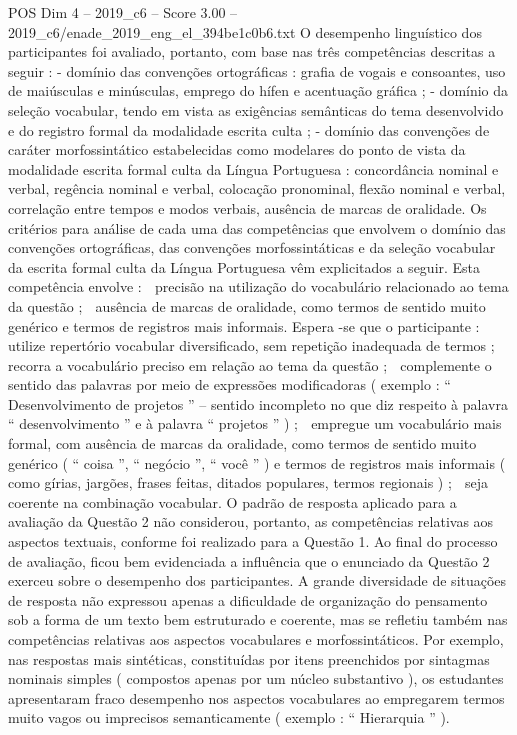 \begin{textsample}{POS Dim 4 – 2019\_c6 – Score 3.00 – 2019\_c6/enade\_2019\_eng\_el\_394be1c0b6.txt}
O desempenho linguístico dos participantes foi avaliado, portanto, com base nas três competências descritas a seguir : - domínio das convenções ortográficas : grafia de vogais e consoantes, uso de maiúsculas e minúsculas, emprego do hífen e acentuação gráfica ; - domínio da seleção vocabular, tendo em vista as exigências semânticas do tema desenvolvido e do registro formal da modalidade escrita culta ; - domínio das convenções de caráter morfossintático estabelecidas como modelares do ponto de vista da modalidade escrita formal culta da Língua Portuguesa : concordância nominal e verbal, regência nominal e verbal, colocação pronominal, flexão nominal e verbal, correlação entre tempos e modos verbais, ausência de marcas de oralidade.
Os critérios para análise de cada uma das competências que envolvem o domínio das convenções ortográficas, das convenções morfossintáticas e da seleção vocabular da escrita formal culta da Língua Portuguesa vêm explicitados a seguir.
Esta competência envolve :  precisão na utilização do vocabulário relacionado ao tema da questão ;  ausência de marcas de oralidade, como termos de sentido muito genérico e termos de registros mais informais.
Espera -se que o participante :  utilize repertório vocabular diversificado, sem repetição inadequada de termos ;  recorra a vocabulário preciso em relação ao tema da questão ;  complemente o sentido das palavras por meio de expressões modificadoras ( exemplo : “ Desenvolvimento de projetos ” – sentido incompleto no que diz respeito à palavra “ desenvolvimento ” e à palavra “ projetos ” ) ;  empregue um vocabulário mais formal, com ausência de marcas da oralidade, como termos de sentido muito genérico ( “ coisa ”, “ negócio ”, “ você ” ) e termos de registros mais informais ( como gírias, jargões, frases feitas, ditados populares, termos regionais ) ;  seja coerente na combinação vocabular.
O padrão de resposta aplicado para a avaliação da Questão 2 não considerou, portanto, as competências relativas aos aspectos textuais, conforme foi realizado para a Questão 1.
Ao final do processo de avaliação, ficou bem evidenciada a influência que o enunciado da Questão 2 exerceu sobre o desempenho dos participantes.
A grande diversidade de situações de resposta não expressou apenas a dificuldade de organização do pensamento sob a forma de um texto bem estruturado e coerente, mas se refletiu também nas competências relativas aos aspectos vocabulares e morfossintáticos.
Por exemplo, nas respostas mais sintéticas, constituídas por itens preenchidos por sintagmas nominais simples ( compostos apenas por um núcleo substantivo ), os estudantes apresentaram fraco desempenho nos aspectos vocabulares ao empregarem termos muito vagos ou imprecisos semanticamente ( exemplo : “ Hierarquia ” ).

\end{textsample}

